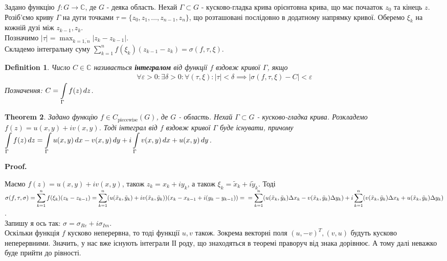 \documentclass[a4paper, 10pt]{article}
\makeatletter
\def\qed{$\blacksquare$}
\theoremstyle{theoremdd}
\newtheorem{theorem}{Theorem}[subsection]
\theoremstyle{theoremdd}
\newtheorem{definition}[theorem]{Definition}
\theoremstyle{theoremdd}
\theoremstyle{theoremdd}
\theoremstyle{theoremdd}
\theoremstyle{theoremdd}
\theoremstyle{theoremdd}
\theoremstyle{theoremdd}
\renewenvironment{proof}[1][Proof.\\]{\par
\pushQED{\hfill \qed}%
\normalfont \topsep6\p@\@plus6\p@\relax
\trivlist
\item\relax
{\bfseries
#1\@addpunct{.}}\hspace\labelsep\ignorespaces
}{%
\popQED\endtrivlist\@endpefalse
}
\makeatother
\begin{document}
Задано функцію $f: G \to \mathbb{C}$, де $G$ - деяка область. Нехай $\Gamma \subset G$ - кусково-гладка крива орієнтовна крива, що має почааток $z_0$ та кінець $z$.\\
Розіб'ємо криву $\Gamma$ на дуги точками $\tau = \{z_0,z_1,\dots,z_{n-1},z_n\}$, що розташовані послідовно в додатному напрямку кривої. Оберемо $\xi_k$ на кожній дузі між $z_{k-1},z_k$.\\
Позначимо $|\tau| =\displaystyle \max_{k = \overline{1,n}} |z_{k}-z_{k-1}|$.\\
Складемо інтегральну суму $\displaystyle\sum_{k=1}^n f(\xi_k) (z_{k-1}-z_k) = \sigma(f,\tau,\xi)$.
	
\begin{definition}
Число $C \in \mathbb{C}$ називається \textbf{інтегралом} від функції $f$ вздовж кривої $\Gamma$, якщо
\begin{align*}
\forall \varepsilon > 0: \exists \delta > 0: \forall (\tau,\xi): |\tau| < \delta \implies |\sigma(f,\tau,\xi) - C| < \varepsilon
\end{align*}
Позначення: $C = \displaystyle\int\displaylimits_\Gamma f(z)\,dz$.
\end{definition}

\begin{theorem}
Задано функцію $f \in C_{\text{piecewise}}(G)$, де $G$ - область. Нехай $\Gamma \subset G$ - кусково-гладка крива. Розкладемо $f(z) = u(x,y) + iv(x,y)$. Тоді інтеграл від $f$ вздовж кривої $\Gamma$ буде існувати, причому\\
$\displaystyle\int\displaylimits_\Gamma f(z)\,dz = \int\displaylimits_\Gamma u(x,y)\,dx - v(x,y)\,dy + i \int\displaylimits_\Gamma v(x,y)\,dx + u(x,y)\,dy$.
\end{theorem}

\begin{proof}
Маємо $f(z) = u(x,y) + iv(x,y)$, також $z_k = x_k + iy_k$, а також $\xi_k = \tilde{x}_k + i \tilde{y}_k$. Тоді\\
$\sigma(f,\tau,\sigma) = \displaystyle\sum_{k=1}^n f(\xi_k) (z_k-z_{k-1}) = \sum_{k=1}^n (u(\tilde{x}_k,\tilde{y}_k)+iv(\tilde{x}_k,\tilde{y}_k))(x_k-x_{k-1} + i(y_k-y_{k-1})) = \\
= \sum_{k=1}^n (u(\tilde{x}_k, \tilde{y}_k) \Delta x_k - v(\tilde{x}_k, \tilde{y}_k) \Delta y_k ) + i \sum_{k=1}^n (v(\tilde{x}_k, \tilde{y}_k) \Delta x_k + u(\tilde{x}_k, \tilde{y}_k) \Delta y_k )$.\\
Запишу я ось так: $\sigma = \sigma_{Re} + i \sigma_{Im}$.\\
Оскільки функція $f$ кусково неперервна, то тоді функції $u,v$ також. Зокрема векторні поля $(u,-v)^T, (v,u)$ будуть кусково неперервними. Значить, у нас вже існують інтеграли ІІ роду, що знаходяться в теоремі праворуч від знака дорівнює. А тому далі неважко буде прийти до рівності.
\end{proof}
\end{document}
